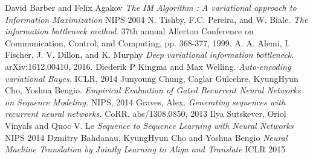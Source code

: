 \documentclass[10pt,oneside,openright]{report}
\begin{document}
\begin{thebibliography}{9} 
David Barber and Felix Agakov
\textit{The IM Algorithm : A variational approach to Information Maximization}
NIPS 2004
N. Tishby, F.C. Pereira, and W. Biale.
\textit{The information bottleneck method}.
37th annual Allerton Conference on Communication, Control, and Computing, pp. 368-377, 1999.
A. A. Alemi, I. Fischer, J. V. Dillon, and K. Murphy
\textit{Deep variational information bottleneck}.
 arXiv:1612.00410, 2016.
 Diederik P Kingma and Max Welling.
 \textit{Auto-encoding variational Bayes.}
  ICLR, 2014
 Junyoung Chung, Caglar Gulcehre, KyungHyun Cho, Yoshua Bengio.
 \textit{Empirical Evaluation of Gated Recurrent Neural Networks on Sequence Modeling.}
  NIPS, 2014
 Graves, Alex.
 \textit{Generating sequences with recurrent neural networks.}
 CoRR, abs/1308.0850, 2013
Ilya Sutskever, Oriol Vinyals and Quoc V. Le
\textit{Sequence to Sequence Learning with Neural Networks}
NIPS 2014
Dzmitry Bahdanau, KyungHyun Cho and Yoshua Bengio
\textit{Neural Machine Translation by Jointly Learning to Align and Translate}
ICLR 2015
\end{thebibliography}
\end{document}
